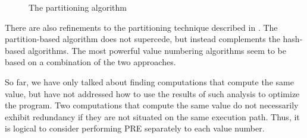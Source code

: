 \begin{figure}[t]
\begin{center}
\caption{The partitioning algorithm}
\label{fig: partition-alg}
\end{center}
\end{figure}

There are also refinements to the partitioning technique described in
\cite{Briggs97}.  The partition-based algorithm does not supercede, but 
instead complements the hash-based algorithms.
The most powerful value numbering algorithms seem to be based on
a combination of the two approaches.

So far, we have only talked about finding computations that compute the
same value, but have not addressed how to use the results of such analysis 
to optimize the program.  Two computations that compute the same value do
not necessarily exhibit redundancy if they are not situated on the same
execution path.  Thus, it is logical to consider performing PRE separately
to each value number.  

